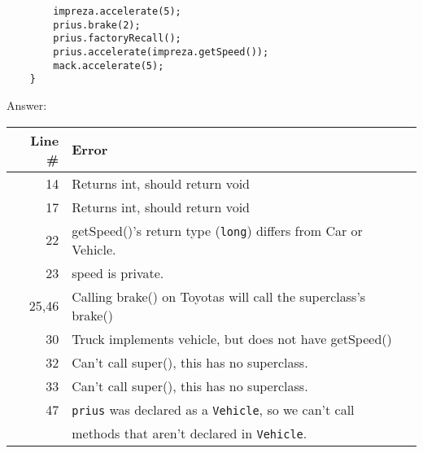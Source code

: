 \documentclass[11pt]{article}
\newenvironment{answer}{\large\lstset{basicstyle=\large\ttfamily}\color{white} \small{Answer:}}{}
\newenvironment{answer}{\large\lstset{basicstyle=\large\ttfamily}\color{red} \small{Answer:}}{}
\begin{document}
\begin{enumerate}
\begin{lstlisting}
		impreza.accelerate(5);
		prius.brake(2);
		prius.factoryRecall();
		prius.accelerate(impreza.getSpeed());
		mack.accelerate(5);
	}
\end{lstlisting}
\begin{answer}
    \begin{tabular}{r l} %
    Line \# & Error \\\hline
    14  	& Returns int, should return void\\
    17  	& Returns int, should return void\\
    22  	& getSpeed()'s return type ({\tt long}) differs from Car or Vehicle.\\
    23  	& speed is private.\\
    25,46	& Calling brake() on Toyotas will call the superclass's brake()\\
    30  	& Truck implements vehicle, but does not have getSpeed()\\
    32  	& Can't call super(), this has no superclass.\\
    33  	& Can't call super(), this has no superclass.\\
    47  	& {\tt prius} was declared as a {\tt Vehicle}, so we can't call\\
    ~  		& methods that aren't declared in {\tt Vehicle}.\\
    \end{tabular}
\end{answer}



\end{enumerate}
\end{document}
